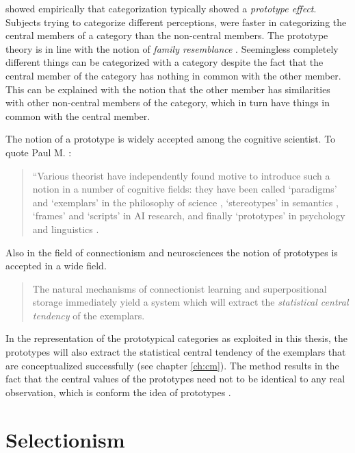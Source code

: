  showed empirically that categorization typically showed a {\em prototype effect}. Subjects trying to categorize different perceptions, were faster in categorizing the central members of a category than the non-central members. The prototype theory is in line with the notion of {\em family resemblance} \cite{wittgenstein:1958}. Seemingless completely different things can be categorized with a category despite the fact that the central member of the category has nothing in common with the other member. This can be explained with the notion that the other member has similarities with other non-central members of the category, which in turn have things in common with the central member. 

The notion of a prototype is widely accepted among the cognitive scientist. To quote Paul M. :

\begin{quote}
``Various theorist have independently found motive to introduce such a notion in a number of cognitive fields: they have been called `paradigms' and `exemplars' in the philosophy of science \cite{kuhn:1962}, `stereotypes' in semantics \cite{putnam:1975}, `frames' \cite{minsky:1981} and `scripts' \cite{schank:1977} in AI research, and finally `prototypes' in psychology \cite{rosch:1976} and linguistics \cite{lakoff:1987}.
\end{quote}

Also in the field of connectionism \cite{a.clark:1993} and neurosciences \cite{p.m.churchland:1989} the notion of prototypes is accepted in a wide field. 

\begin{quote}
The natural mechanisms of connectionist learning and superpositional storage immediately yield a system which will extract the {\em statistical central tendency} of the exemplars.\cite[p. 16]{a.clark:1993}
\end{quote}

In the representation of the prototypical categories as exploited in this thesis, the prototypes will also extract the statistical central tendency of the exemplars that are conceptualized successfully (see chapter \ref{ch:cm}). The method results in the fact that the central values of the prototypes need not to be identical to any real observation, which is conform the idea of prototypes \cite{lakoff:1987}.


\section{Selectionism}\label{s:theory:select}

